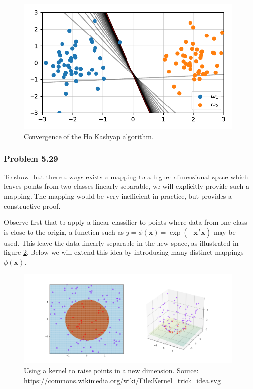 \documentclass[12pt, a4paper]{article}
\newcommand{\vect}[1]{\bm{#1}}
\begin{document}
\begin{easylist}[enumerate]
\begin{figure}[ht!]
	\centering
	\includegraphics[width=0.5\linewidth]{figs/duda_ch5_prob27_b}
	\caption{Convergence of the Ho Kashyap algorithm.}
	\label{fig:duda_ch5_prob27_b}
\end{figure}

\end{easylist}


\subsubsection*{Problem 5.29}
To show that there always exists a mapping to a higher dimensional space which leaves points from two classes linearly separable, we will explicitly provide such a mapping.
The mapping would be very inefficient in practice, but provides a constructive proof.

Observe first that to apply a linear classifier to points where data from one class is close to the origin, a function such as $y = \phi (\vect{x}) = \exp(- \vect{x}^T \vect{x})$ may be used.
This leave the data linearly separable in the new space, as illustrated in figure \ref{fig:1024px_Kernel_trick_idea_svg_wikipedia}.
Below we will extend this idea by introducing many distinct mappings $\phi (\vect{x})$.
\begin{figure}
	\centering
	\includegraphics[width=0.85\linewidth]{figs/1024px_Kernel_trick_idea_svg_wikipedia}
	\caption{Using a kernel to raise points in a new dimension. Source: \url{https://commons.wikimedia.org/wiki/File:Kernel_trick_idea.svg}}
	\label{fig:1024px_Kernel_trick_idea_svg_wikipedia}
\end{figure}
\end{document}
